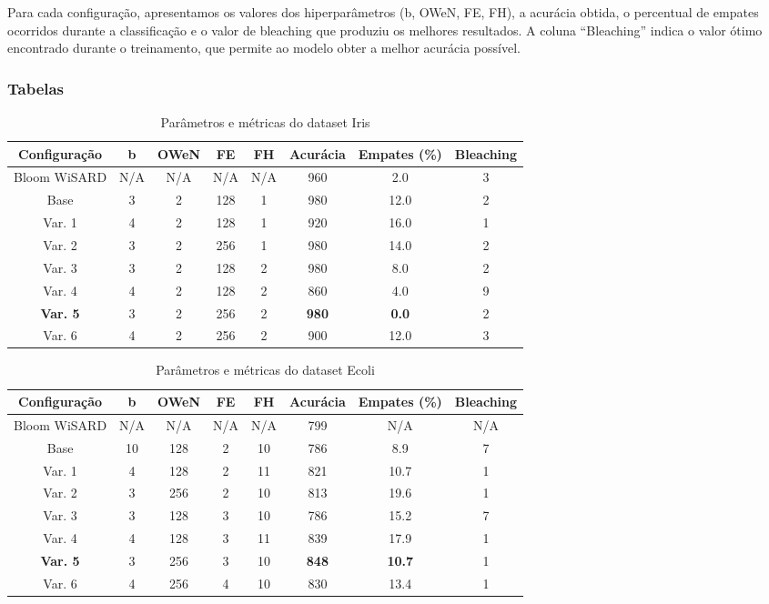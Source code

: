 \documentclass{article}
\begin{document}
Para cada configuração, apresentamos os valores dos hiperparâmetros (b, OWeN, FE, FH), a acurácia obtida, o percentual de empates ocorridos durante a classificação e o valor de bleaching que produziu os melhores resultados. A coluna ``Bleaching'' indica o valor ótimo encontrado durante o treinamento, que permite ao modelo obter a melhor acurácia possível.

\subsubsection{Tabelas}

{\small
\begin{table}[H]
\caption{Parâmetros e métricas do dataset Iris}
\begin{tabular}{|c|c|c|c|c|c|c|c|}
\hline
\textbf{Configuração} & \textbf{b} & \textbf{OWeN} & \textbf{FE} & \textbf{FH} & \textbf{Acurácia} & \textbf{Empates (\%)} & \textbf{Bleaching} \\
\hline
Bloom WiSARD & N/A & N/A & N/A & N/A & 960 & 2.0 & 3 \\
\hline
Base & 3 & 2 & 128 & 1 & 980 & 12.0 & 2 \\
\hline
Var. 1 & 4 & 2 & 128 & 1 & 920 & 16.0 & 1 \\
\hline
Var. 2 & 3 & 2 & 256 & 1 & 980 & 14.0 & 2 \\
\hline
Var. 3 & 3 & 2 & 128 & 2 & 980 & 8.0 & 2 \\
\hline
Var. 4 & 4 & 2 & 128 & 2 & 860 & 4.0 & 9 \\
\hline
\textbf{Var. 5} & 3 & 2 & 256 & 2 & \textbf{980} & \textbf{0.0} & 2 \\
\hline
Var. 6 & 4 & 2 & 256 & 2 & 900 & 12.0 & 3 \\
\hline
\end{tabular}
\end{table}

\begin{table}[H]
\caption{Parâmetros e métricas do dataset Ecoli}
\begin{tabular}{|c|c|c|c|c|c|c|c|}
\hline
\textbf{Configuração} & \textbf{b} & \textbf{OWeN} & \textbf{FE} & \textbf{FH} & \textbf{Acurácia} & \textbf{Empates (\%)} & \textbf{Bleaching} \\
\hline
Bloom WiSARD & N/A & N/A & N/A & N/A & 799 & N/A & N/A \\
\hline
Base & 10 & 128 & 2 & 10 & 786 & 8.9 & 7 \\
\hline
Var. 1 & 4 & 128 & 2 & 11 & 821 & 10.7 & 1 \\
\hline
Var. 2 & 3 & 256 & 2 & 10 & 813 & 19.6 & 1 \\
\hline
Var. 3 & 3 & 128 & 3 & 10 & 786 & 15.2 & 7 \\
\hline
Var. 4 & 4 & 128 & 3 & 11 & 839 & 17.9 & 1 \\
\hline
\textbf{Var. 5} & 3 & 256 & 3 & 10 & \textbf{848} & \textbf{10.7} & 1 \\
\hline
Var. 6 & 4 & 256 & 4 & 10 & 830 & 13.4 & 1 \\
\hline
\end{tabular}
\end{table}

}
\end{document}
